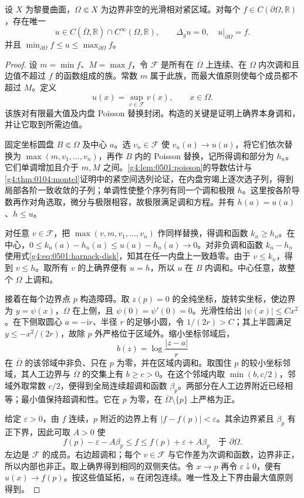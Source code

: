 \begin{theorem}
	\label{g4:thm:0501:dirichlet}
	设 \(X\) 为黎曼曲面，\(\Omega\Subset X\) 为边界非空的光滑相对紧区域。对每个 \(f\in C(\partial\Omega,\mathbb R)\)，存在唯一
	\[
		u\in C(\overline\Omega,\mathbb R)\cap C^\infty(\Omega,\mathbb R),
		\qquad \Delta_g u=0,\quad u|_{\partial\Omega}=f.
	\]
	并且 \(\min_{\partial\Omega}f\le u\le\max_{\partial\Omega}f\)。
\end{theorem}
\begin{proof}
	设 \(m=\min f\)、\(M=\max f\)，令 \(\mathcal F\) 是所有在 \(\overline\Omega\) 上连续、在 \(\Omega\) 内次调和且边值不超过 \(f\) 的函数组成的族。常数 \(m\) 属于此族，而最大值原则使每个成员都不超过 \(M\)。定义
	\[
		u(x)=\sup_{v\in\mathcal F}v(x),\qquad x\in\Omega.
	\]
	该族对有限最大值及内盘 Poisson 替换封闭。构造的关键是证明上确界本身调和，并让它取到所需边值。

	固定坐标圆盘 \(B\Subset\Omega\) 及中心 \(a\)。选 \(v_n\in\mathcal F\) 使 \(v_n(a)\to u(a)\)，将它们依次替换为 \(\max(m,v_1,\ldots,v_n)\)，再作 \(B\) 内的 Poisson 替换，记所得调和部分为 \(h_n\)。它们单调增加且介于 \(m,M\) 之间。\cref{g4:lem:0501:poisson}的导数估计与\cref{g4:thm:0104:montel}证明中的紧空间选列论证，在内盘穷竭上逐次选子列，得到局部各阶一致收敛的子列；单调性使整个序列有同一个调和极限 \(h\)。这里按各阶导数再作对角选取，微分与极限相容，故极限满足调和方程。并有 \(h(a)=u(a)\)、\(h\le u\)。

	对任意 \(v\in\mathcal F\)，把 \(\max(v,m,v_1,\ldots,v_n)\) 作同样替换，得调和函数 \(k_n\ge h_n\)。在中心，\(0\le k_n(a)-h_n(a)\le u(a)-h_n(a)\to0\)。对非负调和函数 \(k_n-h_n\) 使用式\eqref{g4:eq:0501:harnack-disk}，知其在任一内盘上一致趋零。由于 \(v\le k_n\)，得到 \(v\le h\)。取所有 \(v\) 的上确界便有 \(u=h\)，所以 \(u\) 在 \(B\) 内调和。中心任意，故整个 \(\Omega\) 上调和。

	接着在每个边界点 \(p\) 构造障碍。取 \(z(p)=0\) 的全纯坐标，旋转实坐标，使边界为 \(y=\psi(x)\)，\(\Omega\) 在上侧，且 \(\psi(0)=\psi'(0)=0\)。光滑性给出 \(|\psi(x)|\le Cx^2\)。在下侧取圆心 \(a=-\mathrm{i}r\)、半径 \(r\) 的足够小圆，令 \(1/(2r)>C\)；其上半圆满足 \(y\le-x^2/(2r)\)，故除 \(p\) 外严格位于区域外。缩小坐标邻域后，
	\[
		b(z)=\log\frac{|z-a|}{r}
	\]
	在 \(\overline\Omega\) 的该邻域中非负、只在 \(p\) 为零，并在区域内调和。取围住 \(p\) 的较小坐标邻域，其人工边界与 \(\overline\Omega\) 的交集上有 \(b\ge c>0\)。在这个邻域内取 \(\min(b,c/2)\)，邻域外取常数 \(c/2\)，便得到全局连续超调和函数 \(\beta_p\)。两部分在人工边界附近已经相等；最小值保持超调和性。它在 \(p\) 为零，在 \(\overline\Omega\setminus\{p\}\) 上严格为正。

	给定 \(\varepsilon>0\)，由 \(f\) 连续，\(p\) 附近的边界上有 \(|f-f(p)|<\varepsilon\)。其余边界紧且 \(\beta_p\) 有正下界，因此可取 \(A>0\) 使
	\[
		f(p)-\varepsilon-A\beta_p\le f
		\le f(p)+\varepsilon+A\beta_p
		\quad\text{于 }\partial\Omega.
	\]
	左边是 \(\mathcal F\) 的成员。右边超调和；每个 \(v\in\mathcal F\) 与它作差为次调和函数，边界非正，所以内部也非正。取上确界得到相同的双侧夹估。令 \(x\to p\) 再令 \(\varepsilon\downarrow0\)，便有 \(u(x)\to f(p)\)。按这些值延拓，\(u\) 在闭包连续。唯一性及上下界由最大值原则得到。
\end{proof}

